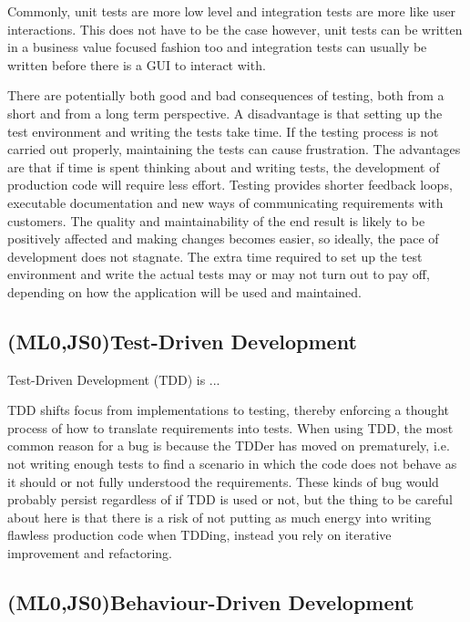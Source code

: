 \documentclass[11pt]{article}
\begin{document}
Commonly, unit tests are more low level and integration tests are more like user interactions. This does not have to be the case however, unit tests can be written in a business value focused fashion too and integration tests can usually be written before there is a GUI to interact with. \cite[question~20]{Ahnve}

There are potentially both good and bad consequences of testing, both from a short and from a long term perspective. A disadvantage is that setting up the test environment and writing the tests take time. If the testing process is not carried out properly, maintaining the tests can cause frustration. The advantages are that if time is spent thinking about and writing tests, the development of production code will require less effort. Testing provides shorter feedback loops, executable documentation and new ways of communicating requirements with customers. The quality and maintainability of the end result is likely to be positively affected and making changes becomes easier, so ideally, the pace of development does not stagnate. The extra time required to set up the test environment and write the actual tests may or may not turn out to pay off, depending on how the application will be used and maintained.

\subsection{(ML0,JS0)Test-Driven Development}

Test-Driven Development (TDD) is ...

TDD shifts focus from implementations to testing, thereby enforcing a thought process of how to translate requirements into tests. When using TDD, the most common reason for a bug is because the TDDer has moved on prematurely, i.e. not writing enough tests to find a scenario in which the code does not behave as it should or not fully understood the requirements. These kinds of bug would probably persist regardless of if TDD is used or not, but the thing to be careful about here is that there is a risk of not putting as much energy into writing flawless production code when TDDing, instead you rely on iterative improvement and refactoring. %

\subsection{(ML0,JS0)Behaviour-Driven Development}
\end{document}
